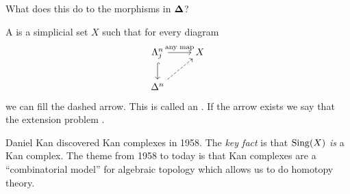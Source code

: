 \begin{exercise}
	What does this do to the morphisms in $\mathbf{\Delta}$?
\end{exercise}
\begin{definition}
	A  is a simplicial set $X$ such that for every diagram
	\[
		\begin{tikzcd}
			\Lambda^{n}_j \ar[r,"\text{any map}"] \ar[d,hook] & X \\
			\Delta^{n} \ar[ur,dashed]
		\end{tikzcd}
	\]
	we can fill the dashed arrow. This is called an . If the arrow
	exists we say that the extension problem .
\end{definition}
Daniel Kan discovered Kan complexes in 1958. The \emph{key fact} is that $\operatorname{Sing}(X)$
\emph{is} a Kan complex. The theme from 1958 to today is that Kan complexes are a
``combinatorial model'' for algebraic topology which allows us to do homotopy theory.

